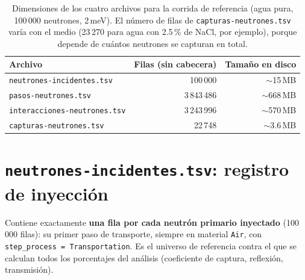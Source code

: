 \documentclass[11pt,a4paper]{article}
\newcommand{\archivo}[1]{\texttt{#1}} %
\newcommand{\var}[1]{\texttt{#1}}
\begin{document}
\begin{table}[H]
\centering
\begin{tabularx}{\linewidth}{X r r}
\toprule
\textbf{Archivo} & \textbf{Filas (sin cabecera)} & \textbf{Tamaño en disco} \\
\midrule
\archivo{neutrones-incidentes.tsv} & 100\,000 & $\sim$15\,MB \\
\archivo{pasos-neutrones.tsv} & 3\,843\,486 & $\sim$668\,MB \\
\archivo{interacciones-neutrones.tsv} & 3\,243\,996 & $\sim$570\,MB \\
\archivo{capturas-neutrones.tsv} & 22\,748 & $\sim$3.6\,MB \\
\bottomrule
\end{tabularx}
\caption{Dimensiones de los cuatro archivos para la corrida de referencia (agua pura, 100\,000
neutrones, 2\,meV). El número de filas de \archivo{capturas-neutrones.tsv} varía con el medio
(23\,270 para agua con 2.5\,\% de NaCl, por ejemplo), porque depende de cuántos neutrones se
capturan en total.}
\label{tab:tamanos}
\end{table}

\section{\archivo{neutrones-incidentes.tsv}: registro de inyección}

Contiene exactamente \textbf{una fila por cada neutrón primario inyectado} (100\,000 filas): su
primer paso de transporte, siempre en material \var{Air}, con \var{step\_process =
Transportation}. Es el universo de referencia contra el que se calculan todos los porcentajes del
análisis (coeficiente de captura, reflexión, transmisión).
\end{document}
